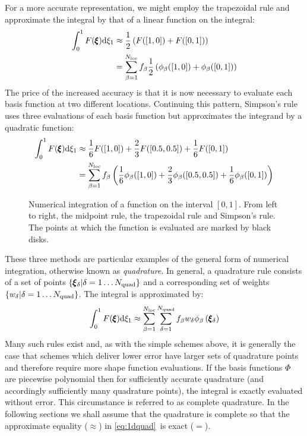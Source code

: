 \documentclass[a4paper, 11pt]{book}
\newcommand{\ifhtlatex}[2]{\ifthenelse{\boolean{HTLatex}}{#1}{#2}}
\newcommand{\xfig}[1]{
  \ifhtlatex{
    \texttt{[image: \#1.png]}
  }{
    
  }
}
\begin{document}
For a more accurate representation, we might employ the trapezoidal rule and
approximate the integral by that of a linear function on the integral:
\begin{equation}
  \begin{split}
    \int_{0}^1 F(\pmb{\xi})\mathrm{d}\xi_1&\approx \frac{1}{2}
    \left(F([1,0])+F([0,1])\right)\\ 
    &=\sum_{\beta=1}^{N_\mathrm{loc}} f_{\beta}\frac{1}{2}\left(\phi_{\beta}([1,0])
      +\phi_{\beta}([0,1])\right)
  \end{split}
\end{equation}
The price of the increased accuracy is that it is now necessary to evaluate
each basis function at two different locations. Continuing this pattern,
Simpson's rule uses three evaluations of each basis function but
approximates the integrand by a quadratic function:
\begin{equation}
  \begin{split}
    \int_{0}^1 F(\pmb{\xi})\mathrm{d}\xi_1&\approx 
    \frac{1}{6}F([1,0])
    +\frac{2}{3}F([0.5,0.5])
    +\frac{1}{6}F([0,1])\\ 
    &=\sum_{\beta=1}^{N_\mathrm{loc}} f_{\beta}\left(
      \frac{1}{6}\phi_{\beta}([1,0])
      +\frac{2}{3}\phi_{\beta}([0.5,0.5])
      +\frac{1}{6}\phi_{\beta}([0,1])\right)
  \end{split}
\end{equation}
\begin{figure}[t]
  \centering
  \xfig{numerical_integration}
  \caption{Numerical integration of a function on the interval $[0,1]$. From
  left to right, the midpoint rule, the trapezoidal rule and Simpson's
  rule. The points at which the function is evaluated are marked by black disks.}
\end{figure}
These three methods are particular examples of the general form of numerical
integration, otherwise known as \emph{quadrature}. In general, a quadrature
rule consists of a set of points $\{\pmb{\xi}_\delta|\delta=1\ldots N_\mathrm{quad}\}$ and a corresponding set of
weights $\{w_\delta|\delta=1\ldots N_\mathrm{quad}\}$. The integral is approximated
by:
\begin{equation}\label{eq:1dquad}
    \int_{0}^1 F(\pmb{\xi})\mathrm{d}\xi_1\approx\sum_{\beta=1}^{N_\mathrm{loc}}
    \sum_{\delta=1}^{N_\mathrm{quad}} f_{\beta} w_\delta \phi_{\beta}\left(\pmb{\xi}_\delta\right)
\end{equation}
Many such rules exist and, as with the simple schemes above, it is generally
the case that schemes which deliver lower error have larger sets of
quadrature points and therefore require more shape function evaluations. If
the basis functions $\Phi$ are piecewise polynomial then for sufficiently
accurate quadrature (and accordingly sufficiently many quadrature points),
the integral is exactly evaluated without error. This circumstance is
referred to as complete quadrature. In the following sections we shall
assume that the quadrature is complete so that the approximate equality
($\approx$) in \eqref{eq:1dquad}\ is exact ($=$).
\end{document}
